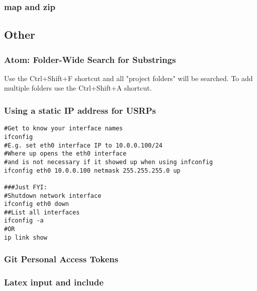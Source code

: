 \documentclass{article}
\begin{document}
\subsubsection{map and zip}

\subsection{Other}

\subsubsection{Atom: Folder-Wide Search for Substrings}
Use the Ctrl+Shift+F shortcut and all "project folders" will be searched. To add multiple folders use the Ctrl+Shift+A shortcut.

\subsubsection{Using a static IP address for USRPs}
\begin{verbatim}
#Get to know your interface names
ifconfig 
#E.g. set eth0 interface IP to 10.0.0.100/24
#Where up opens the eth0 interface 
#and is not necessary if it showed up when using infconfig
ifconfig eth0 10.0.0.100 netmask 255.255.255.0 up

###Just FYI:
#Shutdown network interface
ifconfig eth0 down
##List all interfaces
ifconfig -a
#OR
ip link show
\end{verbatim}

\subsubsection{Git Personal Access Tokens}

\subsubsection{Latex input and include}
\end{document}

